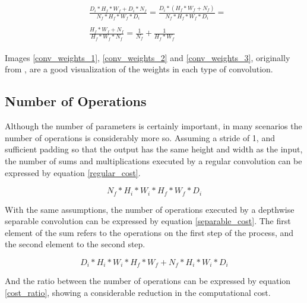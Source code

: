 \documentclass[runningheads]{llncs}
\begin{document}
\begin{align}
    \label{weights_ratio}
    \begin{aligned}
        & \frac{ D_{i} * H_{f} * W_{f} + D_{i} * N_{f} }{ N_{f} * H_{f} * W_{f} * D_{i} }
        = \frac{ D_{i} * (H_{f} * W_{f} + N_{f}) }{ N_{f} * H_{f} * W_{f} * D_{i} } = \\ \\
        & \frac{ H_{f} * W_{f} + N_{f} }{ H_{f} * W_{f} * N_{f} }
        = \frac{ 1 }{ N_{f} } + \frac{ 1 }{ H_{f} * W_{f} }
    \end{aligned}
\end{align}

Images \ref{conv_weights_1}, \ref{conv_weights_2} and \ref{conv_weights_3}, originally from \cite{howard2017mobilenets}, are a good visualization of the weights in each type of convolution.

\subsection{Number of Operations}

Although the number of parameters is certainly important, in many scenarios the number of operations is considerably more so. Assuming a stride of 1, and sufficient padding so that the output has the same height and width as the input, the number of sums and multiplications executed by a regular convolution can be expressed by equation \ref{regular_cost}.

\begin{equation}
    \label{regular_cost}
    N_{f} * H_{i} * W_{i} * H_{f} * W_{f} * D_{i}
\end{equation}

With the same assumptions, the number of operations executed by a depthwise separable convolution can be expressed by equation \ref{separable_cost}. The first element of the sum refers to the operations on the first step of the process, and the second element to the second step.

\begin{equation}
    \label{separable_cost}
    D_{i} * H_{i} * W_{i} * H_{f} * W_{f} + N_{f} * H_{i} * W_{i} * D_{i}
\end{equation}

And the ratio between the number of operations can be expressed by equation \ref{cost_ratio}, showing a considerable reduction in the computational cost.
\end{document}
